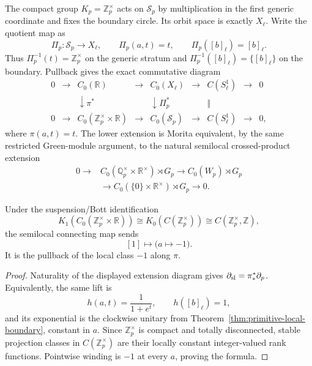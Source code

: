 The compact group $K_p=\mathbb Z_p^\times$ acts on $\mathcal S_p$ by
multiplication in the first generic coordinate and fixes the boundary circle.  Its
orbit space is exactly $X_\ell$.  Write the quotient map as
\[
 \Pi_p:\mathcal S_p\longrightarrow X_\ell,\qquad
 \Pi_p(a,t)=t,\qquad \Pi_p([b]_\ell)=[b]_\ell.
\]
Thus $\Pi_p^{-1}(t)=\mathbb Z_p^\times$ on the generic stratum and
$\Pi_p^{-1}([b]_\ell)=\{[b]_\ell\}$ on the boundary.  Pullback gives the exact
commutative diagram
\[
\begin{array}{ccccccccc}
0&\to&C_0(\mathbb R)&\to&C_0(X_\ell)&\to&C(S^1_\ell)&\to&0\\
 &&\downarrow\scriptstyle{\pi^*}&&\downarrow\scriptstyle{\Pi_p^*}
 &&\Vert\\
0&\to&C_0(\mathbb Z_p^\times\times\mathbb R)&\to&C_0(\mathcal S_p)
 &\to&C(S^1_\ell)&\to&0,
\end{array}
\]
where $\pi(a,t)=t$.  The lower extension is Morita equivalent, by the same
restricted Green-module argument, to the natural semilocal crossed-product
extension
\[
\begin{split}
0\to {}&C_0(\mathbb Q_p^\times\times\mathbb R^\times)\rtimes G_p
\longrightarrow C_0(W_p)\rtimes G_p\\
&\longrightarrow C_0(\{0\}\times\mathbb R^\times)\rtimes G_p\to0.
\end{split}
\]

\begin{corollary}
\label{cor:primitive-semilocal-boundary}
Under the suspension/Bott identification
\[
 K_1\!\left(C_0(\mathbb Z_p^\times\times\mathbb R)\right)
 \cong K_0(C(\mathbb Z_p^\times))
 \cong C(\mathbb Z_p^\times,\mathbb Z),
\]
the semilocal connecting map sends
\[
 [1]\longmapsto \bigl(a\mapsto-1\bigr).
\]
It is the pullback of the local class $-1$ along $\pi$.
\end{corollary}

\begin{proof}
Naturality of the displayed extension diagram gives
$\partial_{\rm sl}=\pi^*_*\partial_p$.  Equivalently, the same lift is
\[
 h(a,t)=\frac1{1+e^t},\qquad h([b]_\ell)=1,
\]
and its exponential is the clockwise unitary from
Theorem~\ref{thm:primitive-local-boundary}, constant in $a$.  Since
$\mathbb Z_p^\times$ is compact and totally disconnected, stable projection
classes in $C(\mathbb Z_p^\times)$ are their locally constant integer-valued
rank functions.  Pointwise winding is $-1$ at every $a$, proving the formula.
\end{proof}

